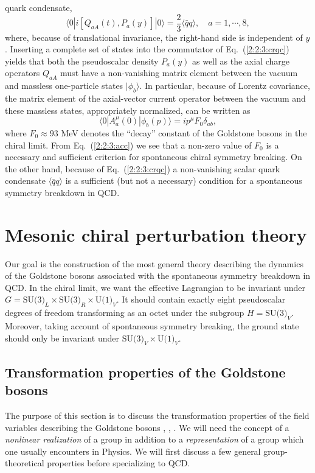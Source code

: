 \documentclass[twoside,12pt]{article}
\begin{document}
quark condensate,
\begin{equation}
\label{2:2:3:crqc}
\langle 0|i[Q_{aA}(t),P_a(y)]|0\rangle
=\frac{2}{3}\langle\bar{q}q\rangle,\quad a=1,\cdots,8,
\end{equation}
   where, because of translational invariance, the right-hand side
is independent of $y$.
   Inserting a complete set of states into the commutator of
Eq.~(\ref{2:2:3:crqc}) yields that both the pseudoscalar density $P_a(y)$
as well as the axial charge operators $Q_{aA}$ must have a
non-vanishing matrix element between the vacuum and massless
one-particle states $|\phi_b\rangle$.
   In particular, because of Lorentz covariance, the
matrix element of the axial-vector current operator between the
vacuum and these massless states,
appropriately normalized,
 can be written as
\begin{equation}
\label{2:2:3:acc}
\langle 0|A_a^\mu(0)|\phi_b(p)\rangle=ip^\mu F_0 \delta_{ab},
\end{equation}
where $F_0\approx 93$ MeV denotes the ``decay'' constant of
the Goldstone bosons in the chiral limit.
   From Eq.\ (\ref{2:2:3:acc}) we see that a non-zero value of $F_0$ is a necessary
and sufficient criterion for spontaneous chiral symmetry breaking.
   On the other hand, because of Eq.\ (\ref{2:2:3:crqc})
a non-vanishing scalar quark condensate $\langle \bar{q}
q\rangle$ is a sufficient (but not a necessary) condition for
a spontaneous symmetry breakdown in QCD.

\section{Mesonic chiral perturbation theory}
\label{section_mchpt}
  Our goal is the construction of the most general theory describing the
dynamics of the Goldstone bosons associated with the spontaneous
symmetry breakdown in QCD.
   In the chiral limit, we want the effective Lagrangian to be invariant under
 $G=\mbox{SU(3)}_L\times\mbox{SU(3)}_R\times\mbox{U(1)}_V$.
   It should contain exactly eight pseudoscalar degrees of freedom transforming
as an octet under the subgroup $H=\mbox{SU(3)}_V$.
   Moreover, taking account of spontaneous symmetry breaking, the ground
state should only be invariant under $\mbox{SU(3)}_V\times\mbox{U(1)}_V$.
\subsection{Transformation properties of the Goldstone bosons}
\label{sec_tpgb}
   The purpose of this section is to discuss the transformation properties
of the field variables describing the Goldstone bosons
\cite{Weinberg:de:2:2}, \cite{Coleman:sm:2:2}, \cite{Callan:sn:2:2}.
   We will need the concept of a {\em nonlinear realization} of a group in
addition to a {\em representation} of a group which one usually encounters in
Physics.
   We will first discuss a few general group-theoretical properties before
specializing to QCD.
\end{document}
